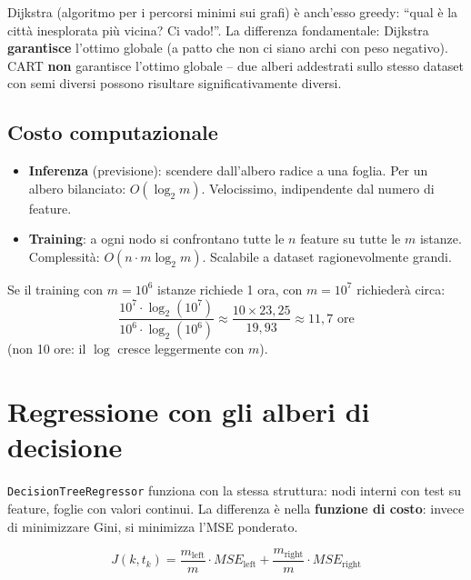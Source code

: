 \begin{exbox}
Dijkstra (algoritmo per i percorsi minimi sui grafi) è anch'esso greedy: ``qual è la città inesplorata più vicina? Ci vado!''. La differenza fondamentale: Dijkstra \textbf{garantisce} l'ottimo globale (a patto che non ci siano archi con peso negativo). CART \textbf{non} garantisce l'ottimo globale -- due alberi addestrati sullo stesso dataset con semi diversi possono risultare significativamente diversi.
\end{exbox}

\subsection{Costo computazionale}

\begin{itemize}
    \item \textbf{Inferenza} (previsione): scendere dall'albero radice a una foglia. Per un albero bilanciato: $O(\log_2 m)$. Velocissimo, indipendente dal numero di feature.
    \item \textbf{Training}: a ogni nodo si confrontano tutte le $n$ feature su tutte le $m$ istanze. Complessità: $O(n \cdot m \log_2 m)$. Scalabile a dataset ragionevolmente grandi.
\end{itemize}

\begin{exbox}
Se il training con $m = 10^6$ istanze richiede 1 ora, con $m = 10^7$ richiederà circa:
\[
\frac{10^7 \cdot \log_2(10^7)}{10^6 \cdot \log_2(10^6)} \approx \frac{10 \times 23{,}25}{19{,}93} \approx 11{,}7 \text{ ore}
\]
(non 10 ore: il $\log$ cresce leggermente con $m$).
\end{exbox}

\section{Regressione con gli alberi di decisione}

\texttt{DecisionTreeRegressor} funziona con la stessa struttura: nodi interni con test su feature, foglie con valori continui. La differenza è nella \textbf{funzione di costo}: invece di minimizzare Gini, si minimizza l'MSE ponderato.

\begin{equation}
J(k, t_k) = \frac{m_\text{left}}{m} \cdot MSE_\text{left} + \frac{m_\text{right}}{m} \cdot MSE_\text{right}
\end{equation}

